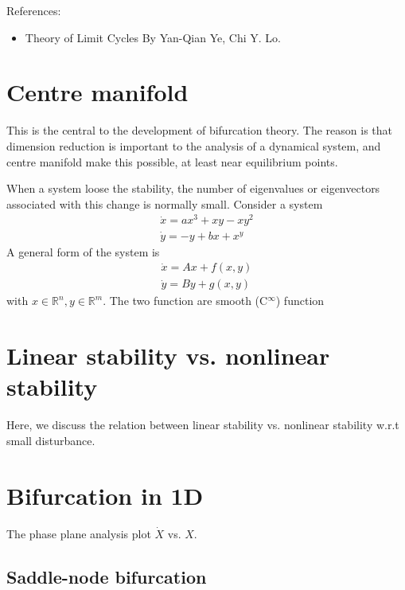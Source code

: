 References:
\begin{itemize}
\item Theory of Limit Cycles By Yan-Qian Ye, Chi Y. Lo.
\end{itemize}

\section{Centre manifold}
\label{sec:centre-manifold}

This is the central to the development of bifurcation theory. The
reason is that dimension reduction is important to the analysis of a
dynamical system, and centre manifold make this possible, at least
near equilibrium points.

When a system loose the stability, the number of eigenvalues or
eigenvectors associated with this change is normally small. 
Consider a system
\begin{equation}
  \label{eq:650}
  \begin{split}
    \dot{x} = ax^3+xy - xy^2 \\
    \dot{y} = -y + bx + x^y
  \end{split}
\end{equation}
A general form of the system is
\begin{equation}
  \label{eq:651}
  \begin{split}
    \dot{x} = Ax + f(x,y) \\
    \dot{y} = By + g(x,y)
  \end{split}
\end{equation}
with $x\in \mathbb{R}^n, y\in \mathbb{R}^m$.  The two function are
smooth (C$^\infty$) function 



\section{Linear stability vs. nonlinear stability}
\label{sec:linear-stability-vs}

Here, we discuss the relation between linear stability vs. nonlinear
stability w.r.t small disturbance. 


\section{Bifurcation in 1D}
\label{sec:bifurcation-1d}

The phase plane analysis plot $\dot{X}$ vs. $X$. 
\subsection{Saddle-node bifurcation}
\label{sec:saddle-node-bifurc}
\label{sec:bifurcation-saddle-node}

